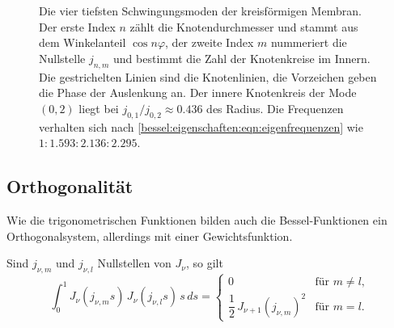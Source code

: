 \begin{figure}
\centering
{}
\caption{Die vier tiefsten Schwingungsmoden der kreisförmigen Membran.
Der erste Index $n$ zählt die Knotendurchmesser und stammt aus dem Winkelanteil $\cos n\varphi$, der zweite Index $m$ nummeriert die Nullstelle $j_{n,m}$ und bestimmt die Zahl der Knotenkreise im Innern.
Die gestrichelten Linien sind die Knotenlinien, die Vorzeichen geben die Phase der Auslenkung an.
Der innere Knotenkreis der Mode $(0,2)$ liegt bei $j_{0,1}/j_{0,2}\approx 0.436$ des Radius.
Die Frequenzen verhalten sich nach \eqref{bessel:eigenschaften:eqn:eigenfrequenzen} wie $1 : 1.593 : 2.136 : 2.295$.
\label{bessel:eigenschaften:fig:moden}}
\end{figure}
 
%
%
\subsection{Orthogonalität
\label{bessel:eigenschaften:subsection:orthogonalitaet}}
Wie die trigonometrischen Funktionen bilden auch die Bessel-Funktionen ein Orthogonalsystem, allerdings mit einer Gewichtsfunktion.
 
\begin{satz}
\label{bessel:eigenschaften:satz:orthogonalitaet}
Sind $j_{\nu,m}$ und $j_{\nu,l}$ Nullstellen von $J_\nu$, so gilt
\begin{equation}
\int_0^1
J_\nu(j_{\nu,m}s)\,
J_\nu(j_{\nu,l}s)\,
s\,ds
=
\begin{cases}
0 & \text{für } m\ne l,\\[3pt]
\dfrac{1}{2}\,J_{\nu+1}(j_{\nu,m})^2 & \text{für } m=l.
\end{cases}
\label{bessel:eigenschaften:eqn:orthogonalitaet}
\end{equation}
\end{satz}


